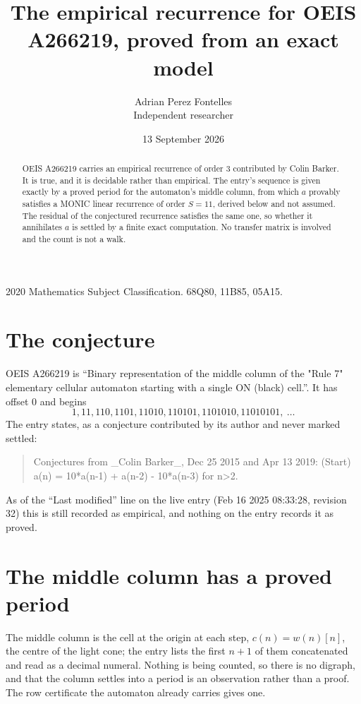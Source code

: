 \documentclass[11pt,a4paper]{article}
\title{The empirical recurrence for OEIS A266219, proved from an exact model}
\author{Adrian Perez Fontelles\\ \small Independent researcher}
\date{13 September 2026}
\theoremstyle{plain}
\theoremstyle{definition}
\begin{document}
\maketitle

\begin{abstract}
OEIS A266219 carries an empirical recurrence of order $3$ contributed by Colin Barker. It is true, and it is
decidable rather than empirical. The entry's sequence is given exactly by a proved period for the automaton's middle column, from
which $a$ provably satisfies a MONIC linear recurrence of order $S=11$, derived below and not
assumed. The residual of the conjectured recurrence satisfies the same one, so whether it
annihilates $a$ is settled by a finite exact computation. No transfer matrix is involved and
the count is not a walk.
\end{abstract}

\noindent\small 2020 Mathematics Subject Classification. 68Q80, 11B85, 05A15.\normalsize

\section{The conjecture}

OEIS A266219 is ``Binary representation of the middle column of the "Rule 7" elementary cellular automaton starting with a single ON (black) cell.''. It has offset $0$ and begins
\[
1, 11, 110, 1101, 11010, 110101, 1101010, 11010101,\ \dots
\]
The entry states, as a conjecture contributed by its author and never marked settled:
\begin{quote}
Conjectures from \_Colin Barker\_, Dec 25 2015 and Apr 13 2019: (Start) a(n) = 10*a(n-1) + a(n-2) - 10*a(n-3) for n>2.
\end{quote}
As of the ``Last modified'' line on the live entry (Feb 16 2025 08:33:28, revision 32)
this is still recorded as empirical, and nothing on the entry records it as proved.

\section{The middle column has a proved period}

The middle column is the cell at the origin at each step, $c(n)=w(n)[n]$, the centre of the
light cone; the entry lists the first $n+1$ of them concatenated and read as a decimal numeral. Nothing is being counted, so there is no digraph, and that
the column settles into a period is an observation rather than a proof. The row certificate the
automaton already carries gives one.
\end{document}
